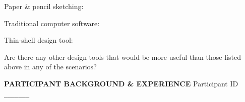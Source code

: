 \documentclass{thesis}
\begin{document}
\hspace*{0.3in} 
Paper \& pencil sketching:
\vspace{0.7in}

\hspace*{0.3in} 
Traditional computer software:
\vspace{0.7in}

\hspace*{0.3in} 
Thin-shell design tool:
\vspace{0.7in}

Are there any other design tools that would be more useful than those listed above
in any of the scenarios?


\newpage
{\bf PARTICIPANT BACKGROUND \& EXPERIENCE}
\hfill Participant ID \verb+_______+
\vspace{0.3in}

\renewcommand\arraystretch{2}
\end{document}
